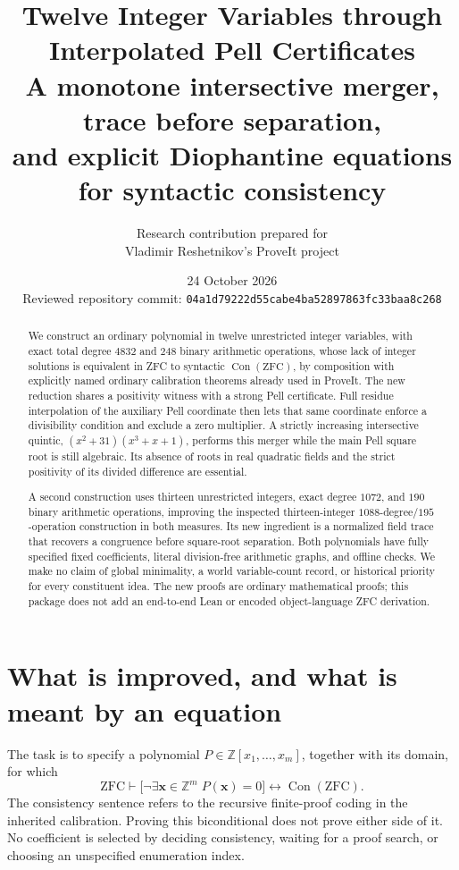 \documentclass[11pt,a4paper]{article}
\title{\vspace{-8mm}\textbf{Twelve Integer Variables through\\Interpolated Pell Certificates}\\[3mm]
\large A monotone intersective merger, trace before separation,\\
and explicit Diophantine equations for syntactic consistency}
\author{Research contribution prepared for\\Vladimir Reshetnikov's ProveIt project}
\date{24 October 2026\\\small Reviewed repository commit:
\texttt{04a1d79222d55cabe4ba52897863fc33baa8c268}}
\theoremstyle{definition}\newtheorem{definition}[theorem]{Definition}
\theoremstyle{remark}\newtheorem{remark}[theorem]{Remark}
\newcommand{\Z}{\mathbb Z}\newcommand{\Q}{\mathbb Q}\newcommand{\N}{\mathbb N}\newcommand{\R}{\mathbb R}
\newcommand{\Con}{\operatorname{Con}}\newcommand{\F}{\mathcal F}
\numberwithin{equation}{section}
\begin{document}
\maketitle
\begin{abstract}
We construct an ordinary polynomial in twelve unrestricted integer variables,
with exact total degree $4832$ and $248$ binary arithmetic operations, whose lack of integer solutions is equivalent
in ZFC to syntactic $\Con(\mathrm{ZFC})$, by composition with explicitly named
ordinary calibration theorems already used in ProveIt. The new reduction
shares a positivity witness with a strong Pell certificate. Full residue
interpolation of the auxiliary Pell coordinate then lets that same coordinate
enforce a divisibility condition and exclude a zero multiplier. A strictly
increasing intersective quintic,
$(x^2+31)(x^3+x+1)$, performs this merger while the main Pell square root is
still algebraic. Its absence of roots in real quadratic fields and the
strict positivity of its divided difference are essential.

A second construction uses thirteen unrestricted integers, exact degree
$1072$, and $190$ binary arithmetic operations, improving the inspected
thirteen-integer $1088$-degree/$195$-operation construction in both measures.
Its new ingredient is a normalized field trace that recovers a congruence
before square-root separation. Both polynomials have fully specified fixed
coefficients, literal division-free arithmetic graphs, and offline checks.
We make no claim of global minimality, a world variable-count record, or
historical priority for every constituent idea. The new proofs are ordinary
mathematical proofs; this package does not add an end-to-end Lean or encoded
object-language ZFC derivation.
\end{abstract}
\clearpage\tableofcontents\clearpage

\section{What is improved, and what is meant by an equation}

The task is to specify a polynomial $P\in\Z[x_1,\ldots,x_m]$, together with
its domain, for which
\begin{equation}
 \mathrm{ZFC}\vdash
 \bigl[\neg\exists\mathbf x\in\Z^m\;P(\mathbf x)=0\bigr]
 \longleftrightarrow\Con(\mathrm{ZFC}).
 \label{eq:target}
\end{equation}
The consistency sentence refers to the recursive finite-proof coding in
the inherited calibration. Proving this biconditional does not prove
either side of it. No coefficient is selected by deciding consistency,
waiting for a proof search, or choosing an unspecified enumeration index.
\end{document}
